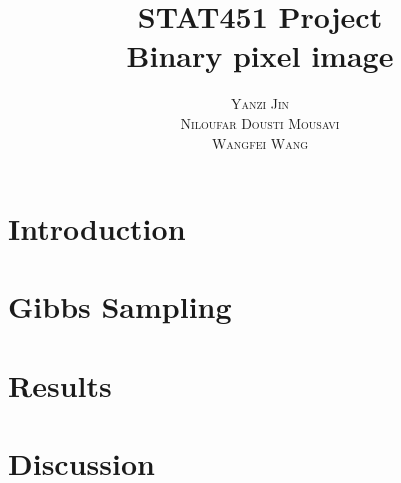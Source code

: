 \documentclass[12pt]{article}
\title{\Huge \textbf{STAT451 Project}   \\ \huge Binary pixel image }
\author{\textsc{Yanzi Jin} \\\textsc{Niloufar Dousti Mousavi}\\ \textsc{Wangfei Wang}}
\date{\vspace{-5ex}}
\begin{document}
\maketitle
\thispagestyle{empty}
\clearpage
\setcounter{page}{1}




\section{Introduction}


\section{Gibbs Sampling}


\section{Results}


\section{Discussion}





 
 
\end{document}
